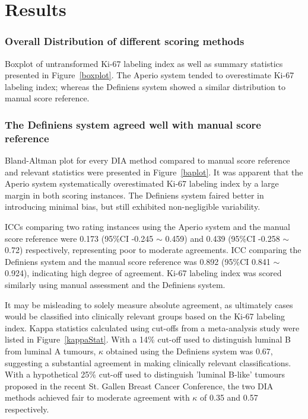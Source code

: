 \documentclass[final,5p,times,twocolumn]{elsarticle}
\begin{document}
\section*{Results}

\subsubsection*{Overall Distribution of different scoring methods}
Boxplot of untransformed Ki-67 labeling index as well as summary statistics presented in Figure~\ref{boxplot}. The Aperio system tended to overestimate Ki-67 labeling index; whereas the Definiens system showed a similar distribution to manual score reference.

\subsubsection*{The Definiens system agreed well with manual score reference}

Bland-Altman plot for every DIA method compared to manual score reference and relevant statistics were presented in Figure~\ref{baplot}. It was apparent that the Aperio system systematically overestimated Ki-67 labeling index by a large margin in both scoring instances. The Definiens system faired better in introducing minimal bias, but still exhibited non-negligible variability.

ICCs comparing two rating instances using the Aperio system and the manual score reference were 0.173 (95\%CI -0.245 $\sim$ 0.459) and 0.439 (95\%CI -0.258 $\sim$  0.72) respectively, representing poor to moderate agreements. ICC comparing the Definiens system and the manual score reference was 0.892 (95\%CI 0.841 $\sim$ 0.924), indicating high degree of agreement. Ki-67 labeling index was scored similarly using manual assessment and the Definiens system.

It may be misleading to solely measure absolute agreement, as ultimately cases would be classified into clinically relevant groups based on the Ki-67 labeling index. Kappa statistics calculated using cut-offs from a meta-analysis study were listed in Figure~\ref{kappaStat}. \cite{Petrelli2015} With a 14\% cut-off used to distinguish luminal B from luminal A tumours, \cite{Cheang2009} $\kappa$ obtained using the Definiens system was 0.67, suggesting a substantial agreement in making clinically relevant classifications. \cite{Landis1977} With a hypothetical 25\% cut-off used to distinguish {'}luminal B-like{'} tumours proposed in the recent St. Gallen Breast Cancer Conference, \cite{Coates2015} the two DIA methods achieved fair to moderate agreement with $\kappa$ of 0.35 and 0.57 respectively.
\end{document}
